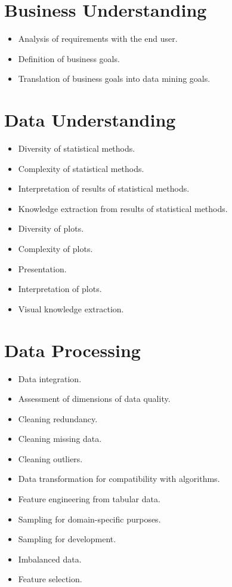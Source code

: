 \documentclass[a4paper,12pt]{report}
\begin{document}
\chapter{Business Understanding}

\begin{itemize}
    \item Analysis of requirements with the end user.
    \item Definition of business goals.
    \item Translation of business goals into data mining goals.
\end{itemize}




\chapter{Data Understanding}

\begin{itemize}
    \item Diversity of statistical methods.
	\item Complexity of statistical methods.
	\item Interpretation of results of statistical methods.
	\item Knowledge extraction from results of statistical methods.
	\item Diversity of plots.
	\item Complexity of plots.
	\item Presentation.
	\item Interpretation of plots.
	\item Visual knowledge extraction.
\end{itemize}


\chapter{Data Processing}

\begin{itemize}
    \item Data integration.
    \item Assessment of dimensions of data quality.
    \item Cleaning redundancy.
    \item Cleaning missing data.
    \item Cleaning outliers.
    \item Data transformation for compatibility with algorithms.
    \item Feature engineering from tabular data.
    \item Sampling for domain-specific purposes.
    \item Sampling for development.
    \item Imbalanced data.
    \item Feature selection.
\end{itemize}
\end{document}
